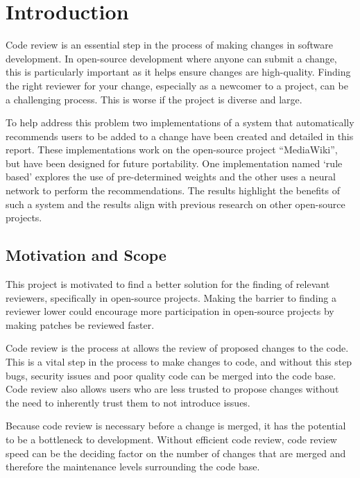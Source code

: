 \chapter{Introduction\label{chap:introduction}}

Code review is an essential step in the process of making changes in software development. In open-source development where anyone can submit a change, this is particularly important as it helps ensure changes are high-quality. Finding the right reviewer for your change, especially as a newcomer to a project, can be a challenging process. This is worse if the project is diverse and large.

To help address this problem two implementations of a system that automatically recommends users to be added to a change have been created and detailed in this report. These implementations work on the open-source project ``MediaWiki'', but have been designed for future portability. One implementation named `rule based' explores the use of pre-determined weights and the other uses a neural network to perform the recommendations. The results highlight the benefits of such a system and the results align with previous research on other open-source projects.

\section{Motivation and Scope}
This project is motivated to find a better solution for the finding of relevant reviewers, specifically in open-source projects. Making the barrier to finding a reviewer lower could encourage more participation in open-source projects by making patches be reviewed faster.

Code review is the process at allows the review of proposed changes to the code. This is a vital step in the process to make changes to code, and without this step bugs, security issues and poor quality code can be merged into the code base. Code review also allows users who are less trusted to propose changes without the need to inherently trust them to not introduce issues.

Because code review is necessary before a change is merged, it has the potential to be a bottleneck to development. Without efficient code review, code review speed can be the deciding factor on the number of changes that are merged and therefore the maintenance levels surrounding the code base.

